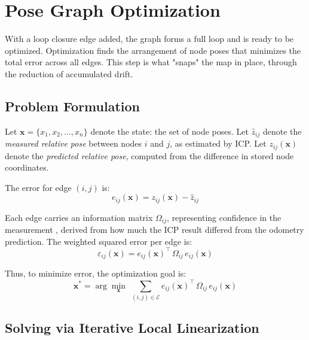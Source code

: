 \documentclass[12pt]{report}
\begin{document}
\chapter{Pose Graph Optimization}

With a loop closure edge added, the graph forms a full loop and is ready to be optimized.
Optimization finds the arrangement of node poses that minimizes the total error across all edges.
This step is what "snaps" the map in place, through the reduction of accumulated drift.

\section{Problem Formulation}

Let $\mathbf{x} = \{x_1, x_2, \ldots, x_n\}$ denote the state: the set of node poses.
Let $\hat{z}_{ij}$ denote the \textit{measured relative pose} between nodes $i$ and $j$, as
estimated by ICP.
Let $z_{ij}(\mathbf{x})$ denote the \textit{predicted relative pose}, computed from the difference
in stored node coordinates.

The error for edge $(i,j)$ is:
\begin{equation}
    e_{ij}(\mathbf{x}) = z_{ij}(\mathbf{x}) - \hat{z}_{ij}
    \label{eq:error}
\end{equation}

Each edge carries an information matrix $\Omega_{ij}$, representing confidence in the measurement
, derived from how much the ICP result differed from the odometry prediction.
The weighted squared error per edge is:
\begin{equation}
    \varepsilon_{ij}(\mathbf{x})
        = e_{ij}(\mathbf{x})^\top\, \Omega_{ij}\, e_{ij}(\mathbf{x})
\end{equation}

Thus, to minimize error, the optimization goal is:
\begin{equation}
    \mathbf{x}^* = \arg\min_{\mathbf{x}}\;
        \sum_{(i,j) \in \mathcal{E}} e_{ij}(\mathbf{x})^\top\, \Omega_{ij}\, e_{ij}(\mathbf{x})
    \label{eq:opt_goal}
\end{equation}

\section{Solving via Iterative Local Linearization}
\end{document}
